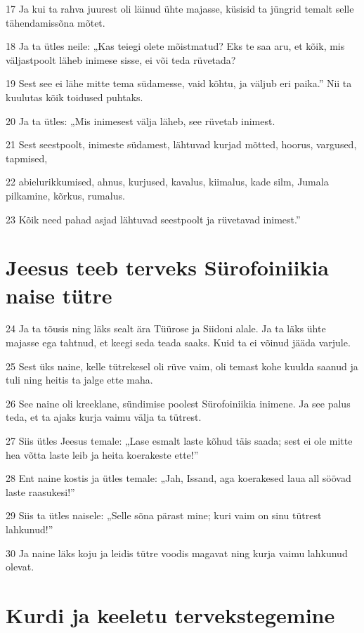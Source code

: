 \par 17 Ja kui ta rahva juurest oli läinud ühte majasse, küsisid ta jüngrid temalt selle tähendamissõna mõtet.
\par 18 Ja ta ütles neile: „Kas teiegi olete mõistmatud? Eks te saa aru, et kõik, mis väljastpoolt läheb inimese sisse, ei või teda rüvetada?
\par 19 Sest see ei lähe mitte tema südamesse, vaid kõhtu, ja väljub eri paika.” Nii ta kuulutas kõik toidused puhtaks.
\par 20 Ja ta ütles: „Mis inimesest välja läheb, see rüvetab inimest.
\par 21 Sest seestpoolt, inimeste südamest, lähtuvad kurjad mõtted, hoorus, vargused, tapmised,
\par 22 abielurikkumised, ahnus, kurjused, kavalus, kiimalus, kade silm, Jumala pilkamine, kõrkus, rumalus.
\par 23 Kõik need pahad asjad lähtuvad seestpoolt ja rüvetavad inimest.”

\section*{Jeesus teeb terveks Sürofoiniikia naise tütre}

\par 24 Ja ta tõusis ning läks sealt ära Tüürose ja Siidoni alale. Ja ta läks ühte majasse ega tahtnud, et keegi seda teada saaks. Kuid ta ei võinud jääda varjule.
\par 25 Sest üks naine, kelle tütrekesel oli rüve vaim, oli temast kohe kuulda saanud ja tuli ning heitis ta jalge ette maha.
\par 26 See naine oli kreeklane, sündimise poolest Sürofoiniikia inimene. Ja see palus teda, et ta ajaks kurja vaimu välja ta tütrest.
\par 27 Siis ütles Jeesus temale: „Lase esmalt laste kõhud täis saada; sest ei ole mitte hea võtta laste leib ja heita koerakeste ette!”
\par 28 Ent naine kostis ja ütles temale: „Jah, Issand, aga koerakesed laua all söövad laste raasukesi!”
\par 29 Siis ta ütles naisele: „Selle sõna pärast mine; kuri vaim on sinu tütrest lahkunud!”
\par 30 Ja naine läks koju ja leidis tütre voodis magavat ning kurja vaimu lahkunud olevat.

\section*{Kurdi ja keeletu tervekstegemine}

